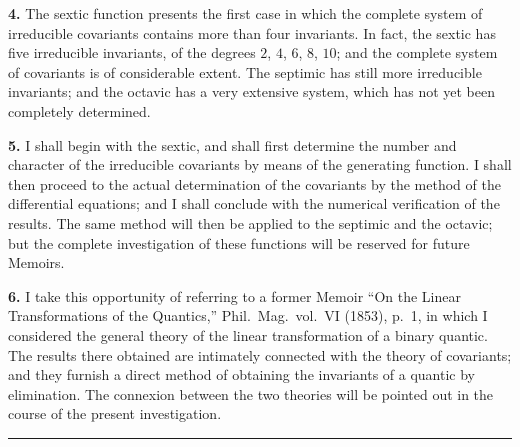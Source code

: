 \documentclass[11pt,a4paper]{book}
\begin{document}
\clearpage
\setcounter{page}{312}

\textbf{4.} The sextic function presents the first case in which the complete system of irreducible covariants contains more than four invariants. In fact, the sextic has five irreducible invariants, of the degrees $2$, $4$, $6$, $8$, $10$; and the complete system of covariants is of considerable extent. The septimic has still more irreducible invariants; and the octavic has a very extensive system, which has not yet been completely determined.

\textbf{5.} I shall begin with the sextic, and shall first determine the number and character of the irreducible covariants by means of the generating function. I shall then proceed to the actual determination of the covariants by the method of the differential equations; and I shall conclude with the numerical verification of the results. The same method will then be applied to the septimic and the octavic; but the complete investigation of these functions will be reserved for future Memoirs.

\textbf{6.} I take this opportunity of referring to a former Memoir ``On the Linear Transformations of the Quantics,'' Phil.\ Mag.\ vol.\ VI (1853), p.~1, in which I considered the general theory of the linear transformation of a binary quantic. The results there obtained are intimately connected with the theory of covariants; and they furnish a direct method of obtaining the invariants of a quantic by elimination. The connexion between the two theories will be pointed out in the course of the present investigation.

\vspace{2ex}
\begin{center}
\rule{0.5\textwidth}{0.4pt}
\end{center}
\end{document}
